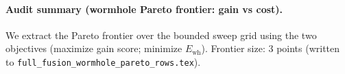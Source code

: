 \paragraph{Audit summary (wormhole Pareto frontier: gain vs cost).} \AuditTag We extract the Pareto frontier over the bounded sweep grid using the two objectives (maximize gain score; minimize $E_{\mathrm{wh}}$). Frontier size: 3 points (written to \texttt{full\_fusion\_wormhole\_pareto\_rows.tex}).